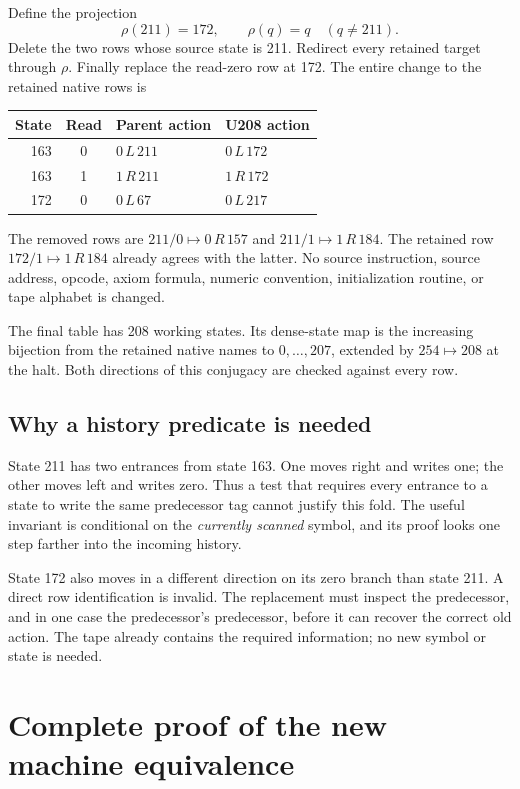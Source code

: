 \documentclass[11pt,letterpaper]{article}
\newcommand{\act}[3]{#1\,#2\,#3}
\begin{document}
Define the projection
\[
 \rho(211)=172,\qquad \rho(q)=q\quad(q\ne211).
\]
Delete the two rows whose source state is 211. Redirect every retained
target through $\rho$. Finally replace the read-zero row at 172. The entire
change to the retained native rows is

\begin{center}
\begin{tabular}{@{}rcll@{}}
\toprule
State & Read & Parent action & U208 action\\
\midrule
163 & 0 & $\act0L{211}$ & $\act0L{172}$\\
163 & 1 & $\act1R{211}$ & $\act1R{172}$\\
172 & 0 & $\act0L{67}$ & $\act0L{217}$\\
\bottomrule
\end{tabular}
\end{center}

The removed rows are $211/0\mapsto\act0R{157}$ and
$211/1\mapsto\act1R{184}$. The retained row
$172/1\mapsto\act1R{184}$ already agrees with the latter. No source
instruction, source address, opcode, axiom formula, numeric convention,
initialization routine, or tape alphabet is changed.

The final table has 208 working states. Its dense-state map is the increasing
bijection from the retained native names to $0,\ldots,207$, extended by
$254\mapsto208$ at the halt. Both directions of this conjugacy are checked
against every row.

\subsection{Why a history predicate is needed}

State 211 has two entrances from state 163. One moves right and writes one;
the other moves left and writes zero. Thus a test that requires every
entrance to a state to write the same predecessor tag cannot justify this
fold. The useful invariant is conditional on the \emph{currently scanned}
symbol, and its proof looks one step farther into the incoming history.

State 172 also moves in a different direction on its zero branch than state
211. A direct row identification is invalid. The replacement must inspect
the predecessor, and in one case the predecessor's predecessor, before it
can recover the correct old action. The tape already contains the required
information; no new symbol or state is needed.

\section{Complete proof of the new machine equivalence}\label{sec:proof}
\end{document}

